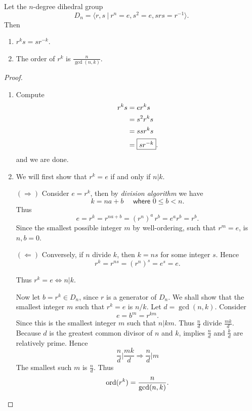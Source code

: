 \begin{theorem}
    Let the $n$-degree dihedral group  
    \[
        D_n = \langle r, s \> | \> r^n = e, s^2 = e, srs = r^{-1} \rangle.
    \]
    Then 
    \begin{enumerate}
        \item $r^ks = sr^{-k}$.
        \item The order of $r^k$ is $\displaystyle \frac{n}{\gcd(n,k)}$.
    \end{enumerate}
\end{theorem}
\begin{proof}
    \begin{enumerate}
        \item Compute 
        \begin{align*}
            r^ks &= er^ks \\
            &= s^2 r^k s \\ 
            &= ssr^k s \\
            &= \fbox{$sr^{-k}$}.
        \end{align*}
        and we are done.

        \item We will first show that $r^k = e$ if and only if $n|k$. 
        
        $(\Rightarrow)$ Consider $e = r^k$, then by 
        \textit{division algorithm} we have 
        \[
            k = na+b \quad \textsf{ where } 0 \leq b < n.
        \]
        Thus 
        \[
            e = r^k = r^{na+b} = (r^n)^a\,r^b= e^ar^b = r^b.
        \]
        Since the smallest possible integer $m$ by well-ordering, such that $r^m = e$, is $n, b =0$.

        $(\Leftarrow)$ Conversely, if $n$ divide $k$, then $k = ns$ for some integer $s$. Hence 
        \[
            r^k = r^{ns} = (r^n)^s = e^s = e.
        \]

        Thus $r^k = e \Longleftrightarrow  n |k$. 
        
        Now let $b = r^k \in D_n$, since $r$ is a generator of $D_n$. We shall show that the smallest integer $m$ such that 
        $r^k = e$ is $n/k$. Let $d = \gcd(n,k)$. Consider
        \[
            e = b^m = r^{km}.
        \]
        Since this is the smallest integer $m$ such that $n|km$. Thus $\frac{n}{d}$ divide $\frac{mk}{d}$. Because $d$ 
        is the greatest common divisor of $n$ and $k$, implies $\frac{n}{d}$ and $\frac{k}{d}$ are relatively prime. Hence 
        \[
            \frac{n}{d} \bigg \vert \frac{mk}{d} \Longrightarrow \frac{n}{d} \bigg \vert m
        \]
        The smallest such $m$ is $\frac{n}{d}$. Thus 
        \[
            \operatorname{ord}(r^k) = \frac{n}{\gcd(n,k)}.
        \]
    \end{enumerate}
\end{proof}

